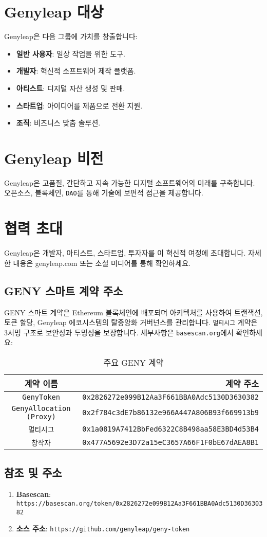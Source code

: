 \documentclass[a4paper,12pt,openany]{book}
\begin{document}
\chapter{Genyleap 대상}
Genyleap은 다음 그룹에 가치를 창출합니다:
\begin{itemize}
    \item \textbf{일반 사용자}: 일상 작업을 위한 도구.
    \item \textbf{개발자}: 혁신적 소프트웨어 제작 플랫폼.
    \item \textbf{아티스트}: 디지털 자산 생성 및 판매.
    \item \textbf{스타트업}: 아이디어를 제품으로 전환 지원.
    \item \textbf{조직}: 비즈니스 맞춤 솔루션.
\end{itemize}

\chapter{Genyleap 비전}
Genyleap은 고품질, 간단하고 지속 가능한 디지털 소프트웨어의 미래를 구축합니다. 오픈소스, 블록체인, \texttt{DAO}를 통해 기술에 보편적 접근을 제공합니다.

\chapter{협력 초대}
Genyleap은 개발자, 아티스트, 스타트업, 투자자를 이 혁신적 여정에 초대합니다. 자세한 내용은 genyleap.com 또는 소셜 미디어를 통해 확인하세요.

\section*{GENY 스마트 계약 주소}
GENY 스마트 계약은 Ethereum 블록체인에 배포되며  아키텍처를 사용하여 트랜잭션, 토큰 할당, Genyleap 에코시스템의 탈중앙화 거버넌스를 관리합니다. \texttt{멀티시그} 계약은 3서명 구조로 보안성과 투명성을 보장합니다. 세부사항은 \texttt{basescan.org}에서 확인하세요:

\begin{table}[h]
\centering
\caption*{주요 GENY 계약}
\small
\begin{tabular}{c r}
\hline
\textbf{계약 이름} & \textbf{계약 주소} \\
\hline
\texttt{GenyToken} & {\texttt{0x2826272e099B12Aa3F661BBA0Adc5130D3630382}} \\
\texttt{GenyAllocation (Proxy)} & {\texttt{0x2f784c3dE7b86132e966A447A806B93f669913b9}} \\
\texttt{멀티시그} & {\texttt{0x1a0819A7412BbFed6322C8B498aa58E3BD4d53B4}} \\
\texttt{창작자} & {\texttt{0x477A5692e3D72a15eC3657A66F1F0bE67dAEA8B1}} \\
\hline
\end{tabular}
\end{table}

\section*{참조 및 주소}

\begin{enumerate}
    \item \textbf{Basescan}: \texttt{https://basescan.org/token/0x2826272e099B12Aa3F661BBA0Adc5130D3630382}
    \item \textbf{소스 주소}: \texttt{https://github.com/genyleap/geny-token}
\end{enumerate}
\end{document}
